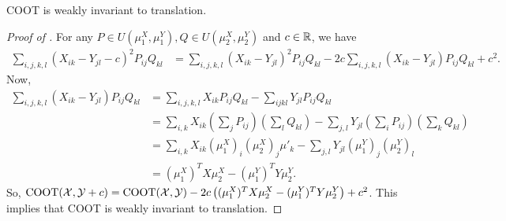 \begin{lemma}
\label{prop:coot_invariant}
    COOT is weakly invariant to translation.
\end{lemma}
\begin{proof}[Proof of ]
For any $P \in U(\mu_1^X, \mu_1^Y), Q \in U(\mu_2^X, \mu_2^Y)$ and $c \in \mathbb R$, we have
\begin{align}
    \sum_{i,j,k,l} (X_{ik} - Y_{jl} - c)^2 P_{ij} Q_{kl}
    &= \sum_{i,j,k,l} (X_{ik} - Y_{jl})^2 P_{ij} Q_{kl}
    - 2c \sum_{i,j,k,l} (X_{ik} - Y_{jl}) P_{ij} Q_{kl} + c^2.
\end{align}
Now,
\begin{align}
    \sum_{i,j,k,l} (X_{ik} - Y_{jl}) P_{ij} Q_{kl}
    &= \sum_{i,j,k,l} X_{ik} P_{ij} Q_{kl} - \sum_{ijkl} Y_{jl} P_{ij} Q_{kl} \\
    &= \sum_{i,k} X_{ik} \left( \sum_j P_{ij} \right) \left( \sum_l Q_{kl} \right)
    - \sum_{j,l} Y_{jl} \left( \sum_i P_{ij} \right) \left( \sum_k Q_{kl} \right) \\
    &= \sum_{i,k} X_{ik} (\mu_1^X)_i (\mu_2^X)_j \mu'_k - \sum_{j,l} Y_{jl} (\mu_1^Y)_j (\mu_2^Y)_l \\
    &= (\mu_1^X)^T X \mu_2^X - (\mu_1^Y)^T Y \mu_2^Y.
\end{align}
So, $\text{COOT}(\mathcal X, \mathcal Y + c) = \text{COOT}(\mathcal X, \mathcal Y) -
2 c \left( (\mu_1^X)^T X \mu_2^X - (\mu_1^Y)^T Y \mu_2^Y \right) + c^2$.
This implies that COOT is weakly invariant to translation.
\end{proof}

